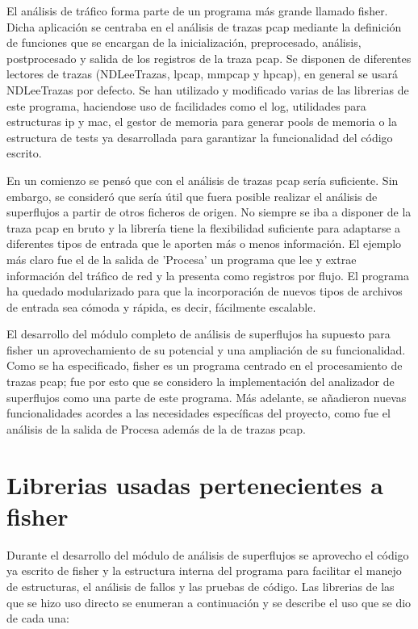 \documentclass[twoside, 12pt]{epstfg}
\begin{document}
El análisis de tráfico forma parte de un programa más grande llamado fisher. Dicha aplicación se centraba en el análisis de trazas pcap mediante la definición de funciones que se encargan de la inicialización, preprocesado, análisis, postprocesado y salida de los registros de la traza pcap. Se disponen de diferentes lectores de trazas (NDLeeTrazas, lpcap, mmpcap y hpcap), en general se usará NDLeeTrazas por defecto. Se han utilizado y modificado varias de las librerias de este programa, haciendose uso de facilidades como el log, utilidades para estructuras ip y mac, el gestor de memoria para generar pools de memoria o la estructura de tests ya desarrollada para garantizar la funcionalidad del código escrito.

En un comienzo se pensó que con el análisis de trazas pcap sería suficiente. Sin embargo, se consideró que sería útil que fuera posible realizar el análisis de superflujos a partir de otros ficheros de origen. No siempre se iba a disponer de la traza pcap en bruto y la librería tiene la flexibilidad suficiente para adaptarse a diferentes tipos de entrada que le aporten más o menos información. El ejemplo más claro fue el de la salida de 'Procesa' un programa que lee y extrae información del tráfico de red y la presenta como registros por flujo. El programa ha quedado modularizado para que la incorporación de nuevos tipos de archivos de entrada sea cómoda y rápida, es decir, fácilmente escalable. 

El desarrollo del módulo completo de análisis de superflujos ha supuesto para fisher un aprovechamiento de su potencial y una ampliación de su funcionalidad. Como se ha especificado, fisher es un programa centrado en el procesamiento de trazas pcap; fue por esto que se considero la implementación del analizador de superflujos como una parte de este programa. Más adelante, se añadieron nuevas funcionalidades acordes a las necesidades específicas del proyecto, como fue el análisis de la salida de Procesa además de la de trazas pcap.


\section{Librerias usadas pertenecientes a fisher}
Durante el desarrollo del módulo de análisis de superflujos se aprovecho el código ya escrito de fisher y la estructura interna del programa para facilitar el manejo de estructuras, el análisis de fallos y las pruebas de código. Las librerias de las que se hizo uso directo se enumeran a continuación y se describe el uso que se dio de cada una:
\end{document}
